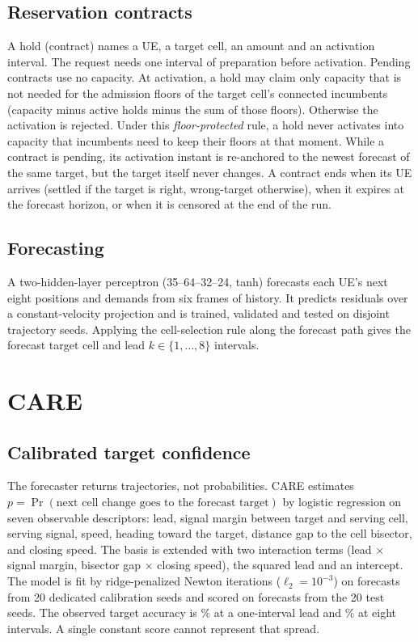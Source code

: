 \documentclass[journal]{IEEEtran}
\begin{document}
\subsection{Reservation contracts}
A hold (contract) names a UE, a target cell, an amount and an activation interval. The request needs one interval of preparation before activation. Pending contracts use no capacity. At activation, a hold may claim only capacity that is not needed for the admission floors of the target cell's connected incumbents (capacity minus active holds minus the sum of those floors). Otherwise the activation is rejected. Under this \emph{floor-protected} rule, a hold never activates into capacity that incumbents need to keep their floors at that moment. While a contract is pending, its activation instant is re-anchored to the newest forecast of the same target, but the target itself never changes. A contract ends when its UE arrives (settled if the target is right, wrong-target otherwise), when it expires at the forecast horizon, or when it is censored at the end of the run.

\subsection{Forecasting}
A two-hidden-layer perceptron (35--64--32--24, tanh) forecasts each UE's next eight positions and demands from six frames of history. It predicts residuals over a constant-velocity projection and is trained, validated and tested on disjoint trajectory seeds. Applying the cell-selection rule along the forecast path gives the forecast target cell and lead $k\in\{1,\dots,8\}$ intervals.

\section{CARE}\label{sec:care}
\subsection{Calibrated target confidence}
The forecaster returns trajectories, not probabilities. CARE estimates $p=\Pr(\text{next cell change goes to the forecast target})$ by logistic regression on seven observable descriptors: lead, signal margin between target and serving cell, serving signal, speed, heading toward the target, distance gap to the cell bisector, and closing speed. The basis is extended with two interaction terms (lead $\times$ signal margin, bisector gap $\times$ closing speed), the squared lead and an intercept. The model is fit by ridge-penalized Newton iterations ($\ell_2=10^{-3}$) on \CalFitExamples{} forecasts from 20 dedicated calibration seeds and scored on \CalTestExamples{} forecasts from the 20 test seeds. The observed target accuracy is \CalAccLeadOne\% at a one-interval lead and \CalAccLeadEight\% at eight intervals. A single constant score cannot represent that spread.
\end{document}
